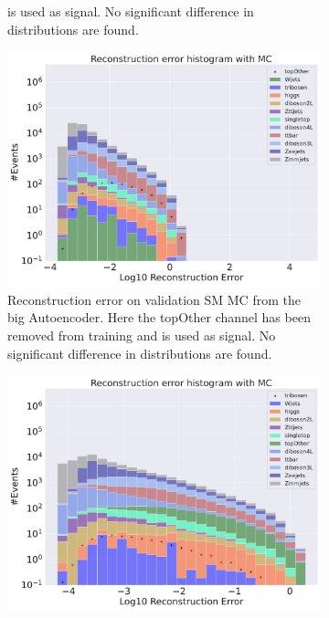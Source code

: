 \begin{figure}[h!]
\begin{subfigure}{.45\textwidth}
{        is used as signal. No significant difference in distributions are found. }
        \label{fig:ae_small_topOther}
    \end{subfigure}
    \hfill
    \begin{subfigure}{.45\textwidth}
        \includegraphics[width=\textwidth]{Figures/AE_testing/big/b_data_recon_big_rm3_feats_sig_topOther.pdf}
        \caption{Reconstruction error on validation SM MC from the big Autoencoder. Here the topOther channel has been removed from training and 
        is used as signal. No significant difference in distributions are found. }
        \label{fig:ae_big_topOther}
    \end{subfigure}
    \hfill
    \begin{subfigure}{.45\textwidth}
        \includegraphics[width=\textwidth]{Figures/AE_testing/small/b_data_recon_big_rm3_feats_sig_triboson.pdf}

\end{subfigure}
\end{figure}
